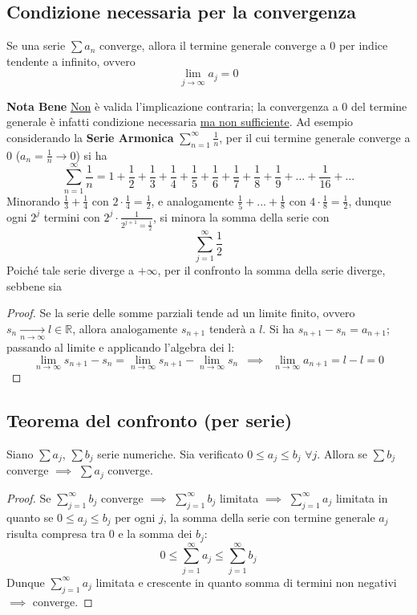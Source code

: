 \documentclass[10pt, oneside]{book}
\theoremstyle{plain}
\begin{document}
\subsection{Condizione necessaria per la convergenza}
\begin{prop}
Se una serie $\sum a_n$ converge, allora il termine generale converge a 0 per indice tendente a infinito, ovvero
\[\lim \limits_{j \rightarrow \infty} a_j = 0\]
\end{prop}
\textbf{Nota Bene} \underline{Non} è valida l'implicazione contraria; la convergenza a 0 del termine generale è infatti condizione necessaria \underline{ma non sufficiente}. Ad esempio considerando la \textbf{Serie Armonica} $\sum_{n=1}^{\infty} \frac{1}{n}$, per il cui termine generale converge a 0 ($a_n = \frac{1}{n} \rightarrow 0$) si ha
\[\sum_{n=1}^{\infty} \frac{1}{n} = 1 + \frac{1}{2} + \frac{1}{3} + \frac{1}{4} + \frac{1}{5} + \frac{1}{6} + \frac{1}{7} + \frac{1}{8} + \frac{1}{9} + ... + \frac{1}{16} + ...\]
Minorando $\frac{1}{3} + \frac{1}{4}$ con $2 \cdot \frac{1}{4} = \frac{1}{2}$, e analogamente $\frac{1}{5} + ... + \frac{1}{8}$ con $4 \cdot \frac{1}{8} = \frac{1}{2}$, dunque ogni $2^j$ termini con $2^j \cdot \frac{1}{2^{j+1} = \frac{1}{2}}$, si minora la somma della serie con 
\[\sum \limits_{j = 1}^{\infty} \frac{1}{2}\]
Poiché tale serie diverge a $+ \infty$, per il confronto la somma della serie diverge, sebbene sia 
\begin{proof}
Se la serie delle somme parziali tende ad un limite finito, ovvero $s_n \xrightarrow[n \rightarrow \infty]{} l \in \mathbb{R}$, allora analogamente $s_{n + 1}$ tenderà a $l$. Si ha $s_{n+1} - s_n = a_{n + 1}$; passando al limite e applicando l'algebra dei l:
\[\lim \limits_{n \rightarrow \infty} s_{n+1} - s_n = \lim \limits_{n \rightarrow \infty} s_{n+1} - \lim \limits_{n \rightarrow \infty} s_{n} \enspace \implies \enspace \lim \limits_{n \rightarrow \infty} a_{n+1} = l - l = 0\]
\end{proof}

\subsection{Teorema del confronto (per serie)}
\begin{ther}
Siano $\sum a_j$, $\sum b_j$ serie numeriche. Sia verificato $0 \leq a_j \leq b_j$ $\forall j$. Allora se $\sum b_j$ converge $\implies$ $\sum a_j$ converge.
\end{ther}
\begin{proof}
Se $\sum_{j=1}^{\infty} b_j$ converge $\implies$ $\sum_{j=1}^{\infty} b_j$ limitata $\implies$ $\sum_{j=1}^{\infty} a_j$ limitata in quanto se $0 \leq a_j \leq b_j$ per ogni $j$, la somma della serie con termine generale $a_j$ risulta compresa tra 0 e la somma dei $b_j$:
\[0 \leq \sum_{j=1}^{\infty} a_j \leq \sum_{j=1}^{\infty} b_j\]
Dunque $\sum_{j=1}^{\infty} a_j$ limitata e crescente in quanto somma di termini non negativi $\implies$ converge.
\end{proof}
\end{document}
